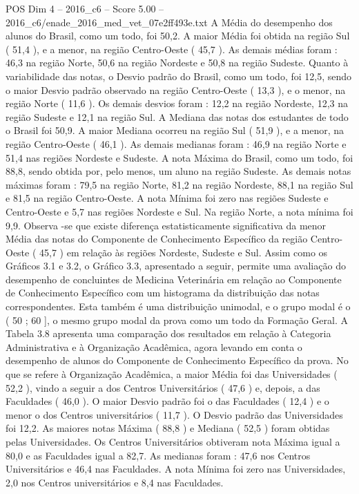 \begin{textsample}{POS Dim 4 – 2016\_c6 – Score 5.00 – 2016\_c6/enade\_2016\_med\_vet\_07e2ff493e.txt}
A Média do desempenho dos alunos do Brasil, como um todo, foi 50,2.
A maior Média foi obtida na região Sul ( 51,4 ), e a menor, na região Centro-Oeste ( 45,7 ).
As demais médias foram : 46,3 na região Norte, 50,6 na região Nordeste e 50,8 na região Sudeste.
Quanto à variabilidade das notas, o Desvio padrão do Brasil, como um todo, foi 12,5, sendo o maior Desvio padrão observado na região Centro-Oeste ( 13,3 ), e o menor, na região Norte ( 11,6 ).
Os demais desvios foram : 12,2 na região Nordeste, 12,3 na região Sudeste e 12,1 na região Sul.
A Mediana das notas dos estudantes de todo o Brasil foi 50,9.
A maior Mediana ocorreu na região Sul ( 51,9 ), e a menor, na região Centro-Oeste ( 46,1 ).
As demais medianas foram : 46,9 na região Norte e 51,4 nas regiões Nordeste e Sudeste.
A nota Máxima do Brasil, como um todo, foi 88,8, sendo obtida por, pelo menos, um aluno na região Sudeste.
As demais notas máximas foram : 79,5 na região Norte, 81,2 na região Nordeste, 88,1 na região Sul e 81,5 na região Centro-Oeste.
A nota Mínima foi zero nas regiões Sudeste e Centro-Oeste e 5,7 nas regiões Nordeste e Sul.
Na região Norte, a nota mínima foi 9,9.
Observa -se que existe diferença estatisticamente significativa da menor Média das notas do Componente de Conhecimento Específico da região Centro-Oeste ( 45,7 ) em relação às regiões Nordeste, Sudeste e Sul.
Assim como os Gráficos 3.1 e 3.2, o Gráfico 3.3, apresentado a seguir, permite uma avaliação do desempenho de concluintes de Medicina Veterinária em relação ao Componente de Conhecimento Específico com um histograma da distribuição das notas correspondentes.
Esta também é uma distribuição unimodal, e o grupo modal é o ( 50 ; 60 ], o mesmo grupo modal da prova como um todo da Formação Geral.
A Tabela 3.8 apresenta uma comparação dos resultados em relação à Categoria Administrativa e à Organização Acadêmica, agora levando em conta o desempenho de alunos do Componente de Conhecimento Específico da prova.
No que se refere à Organização Acadêmica, a maior Média foi das Universidades ( 52,2 ), vindo a seguir a dos Centros Universitários ( 47,6 ) e, depois, a das Faculdades ( 46,0 ).
O maior Desvio padrão foi o das Faculdades ( 12,4 ) e o menor o dos Centros universitários ( 11,7 ).
O Desvio padrão das Universidades foi 12,2.
As maiores notas Máxima ( 88,8 ) e Mediana ( 52,5 ) foram obtidas pelas Universidades.
Os Centros Universitários obtiveram nota Máxima igual a 80,0 e as Faculdades igual a 82,7.
As medianas foram : 47,6 nos Centros Universitários e 46,4 nas Faculdades.
A nota Mínima foi zero nas Universidades, 2,0 nos Centros universitários e 8,4 nas Faculdades.

\end{textsample}

